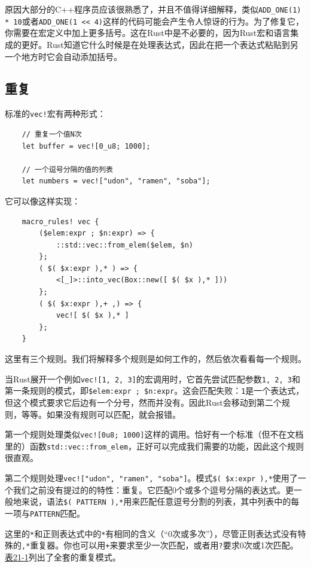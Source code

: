 原因大部分的C++程序员应该很熟悉了，并且不值得详细解释，类似\texttt{ADD\_ONE(1) * 10}或者\texttt{ADD\_ONE(1 << 4)}这样的代码可能会产生令人惊讶的行为。为了修复它，你需要在宏定义中加上更多括号。这在Rust中是不必要的，因为Rust宏和语言集成的更好。Rust知道它什么时候是在处理表达式，因此在把一个表达式粘贴到另一个地方时它会自动添加括号。

\subsection{重复}
标准的\texttt{vec!}宏有两种形式：
\begin{verbatim}
    // 重复一个值N次
    let buffer = vec![0_u8; 1000];

    // 一个逗号分隔的值的列表
    let numbers = vec!["udon", "ramen", "soba"];
\end{verbatim}

它可以像这样实现：
\begin{verbatim}
    macro_rules! vec {
        ($elem:expr ; $n:expr) => {
            ::std::vec::from_elem($elem, $n)
        };
        ( $( $x:expr ),* ) => {
            <[_]>::into_vec(Box::new([ $( $x ),* ]))
        };
        ( $( $x:expr ),+ ,) => {
            vec![ $( $x ),* ]
        };
    }
\end{verbatim}

这里有三个规则。我们将解释多个规则是如何工作的，然后依次看看每一个规则。

当Rust展开一个例如\texttt{vec![1, 2, 3]}的宏调用时，它首先尝试匹配参数\texttt{1, 2, 3}和第一条规则的模式，即\texttt{\$elem:expr ; \$n:expr}。这会匹配失败：\texttt{1}是一个表达式，但这个模式要求它后边有一个分号，然而并没有。因此Rust会移动到第二个规则，等等。如果没有规则可以匹配，就会报错。

第一个规则处理类似\texttt{vec![0u8; 1000]}这样的调用。恰好有一个标准（但不在文档里的）函数\texttt{std::vec::from\_elem}，正好可以完成我们需要的功能，因此这个规则很直观。

第二个规则处理\texttt{vec!["udon", "ramen", "soba"]}。模式\texttt{\$( \$x:expr ),*}使用了一个我们之前没有提过的的特性：重复。它匹配0个或多个逗号分隔的表达式。更一般地来说，语法\texttt{\$( PATTERN ),*}用来匹配任意逗号分割的列表，其中列表中的每一项与\texttt{PATTERN}匹配。

这里的\texttt{*}和正则表达式中的\texttt{*}有相同的含义（“0次或多次”），尽管正则表达式没有特殊的\texttt{,*}重复器。你也可以用\texttt{+}来要求至少一次匹配，或者用\texttt{?}要求0次或1次匹配。\hyperref[t21-1]{表21-1}列出了全套的重复模式。


